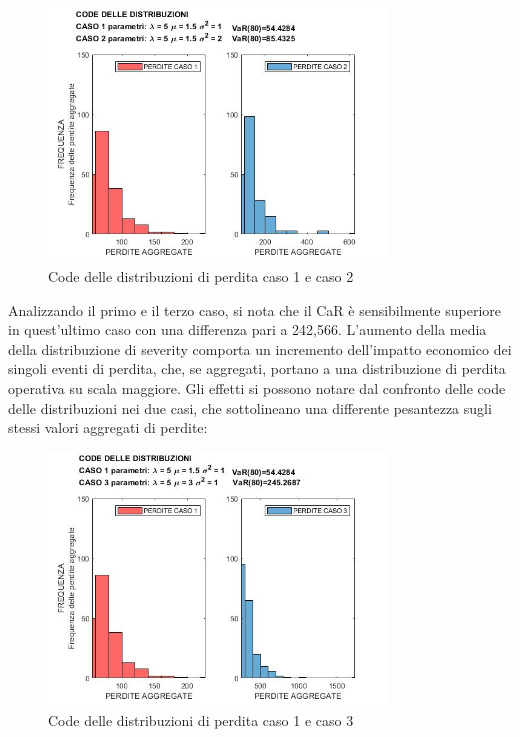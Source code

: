 \documentclass[titlepage]{article}
\begin{document}
\begin{itemize}
\begin{figure}[htbp]
	\centering
	\includegraphics[width=0.8\textwidth]{CODE 1VS2.jpg}
	\caption{\label{fig:CODE 1VS2.jpg}Code delle distribuzioni di perdita caso 1 e caso 2}
\end{figure}
	Analizzando il primo e il terzo caso, si nota che il CaR è sensibilmente superiore in quest’ultimo caso con una differenza pari a 242,566. L’aumento della media della distribuzione di severity comporta un incremento dell’impatto economico dei singoli eventi di perdita, che, se aggregati, portano a una distribuzione di perdita operativa su scala maggiore. Gli effetti si possono notare dal confronto delle code delle distribuzioni nei due casi, che sottolineano una differente pesantezza sugli stessi valori aggregati di perdite:
\begin{figure}[htbp]
	\centering
	\includegraphics[width=0.8\textwidth]{CODE1VS3.jpg}
	\caption{\label{fig:CODE 1VS3.jpg}Code delle distribuzioni di perdita caso 1 e caso 3}
\end{figure}


\end{itemize}
\end{document}
